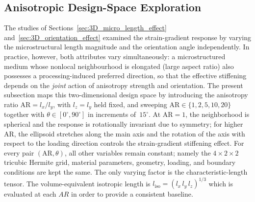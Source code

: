 \documentclass[final,3p,times,fleqn]{elsarticle}
\begin{document}




\subsection{Anisotropic Design-Space Exploration}
\label{sec:3D_design_space}



The studies of Sections~\ref{sec:3D_micro_length_effect}
and~\ref{sec:3D_orientation_effect} examined the strain-gradient
response by varying the microstructural length magnitude and the
orientation angle independently.
In practice, however, both attributes vary simultaneously: a
microstructured medium whose nonlocal neighbourhood is elongated
(large aspect ratio) also possesses a processing-induced preferred
direction, so that the effective stiffening depends on the
\emph{joint} action of anisotropy strength and orientation.
The present subsection maps this two-dimensional design space by
introducing the anisotropy ratio
$\mathrm{AR} = l_{x}/l_{y}$, with $l_{z} = l_{y}$ held fixed, and
sweeping $\mathrm{AR}\in\{1,2,5,10,20\}$ together with
$\theta\in[0^{\circ},90^{\circ}]$ in increments of~$15^{\circ}$.
At $\mathrm{AR} = 1$, the neighborhood is spherical and the response
is rotationally invariant due to symmetry; for higher AR, the ellipsoid
stretches along the main axis and the rotation of the axis with respect
to the loading direction controls the strain-gradient stiffening effect.
For every pair $(\mathrm{AR}, \theta)$, all other variables remain constant;
namely the $4\times2\times2$ tricubic Hermite grid,
material parameters, geometry, loading, and boundary conditions are kept the same.
The only varying factor is the characteristic-length tensor.
The volume-equivalent isotropic length is
$l_{\mathrm{iso}} = (l_{x}\,l_{y}\,l_{z})^{1/3}$ which is evaluated at each $AR$ in order to provide a consistent baseline.
\end{document}
